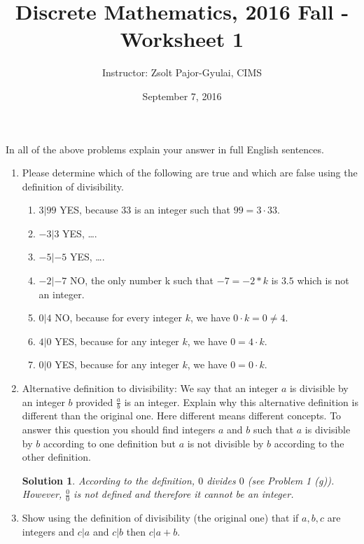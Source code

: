 \documentclass[11pt]{preprint}
\title{Discrete Mathematics, 2016 Fall - Worksheet 1}
\author{Instructor: Zsolt Pajor-Gyulai, CIMS}
\date{September 7, 2016}
\newtheorem{Solution}{Solution}
\begin{document}
\maketitle

In all of the above problems explain your answer in full English sentences.

\begin{enumerate}
\item Please determine which of the following are true and which are false using the definition of divisibility. 
\begin{enumerate}
\item $3|99$ YES, because $33$ is an integer such that $99=3\cdot 33$.
\item $-3|3$ YES, \dots.
\item $-5|-5$ YES, \dots.
\item $-2|-7$ NO, the only number k such that $-7=-2*k$ is $3.5$ which is not an integer.
\item $0|4$ NO, because for every integer $k$, we have $0\cdot k = 0 \neq 4$.
\item $4|0$ YES, because for any integer $k$, we have $0 = 4\cdot k$.
\item $0|0$ YES, because for any integer $k$, we have $0 = 0\cdot k$.
\end{enumerate}
\item Alternative definition to divisibility: We say that an integer $a$ is divisible by an integer $b$ provided $\frac{a}{b}$ is an integer. Explain why this alternative definition is different than the original one. Here different means different concepts. To answer this question you should find integers $a$ and $b$ such that $a$ is divisible by $b$  according to one definition but $a$ is not divisible by $b$ according to the other definition.

\begin{Solution}
According to the definition, $0$ divides $0$ (see Problem 1 (g)). However, $\frac{0}{0}$ is not defined and therefore it cannot be an integer.
\end{Solution}

\item Show using the definition of divisibility (the original one) that if $a,b,c$ are integers and $c|a$ and $c|b$ then $c|a+b$.


\end{enumerate}
\end{document}
